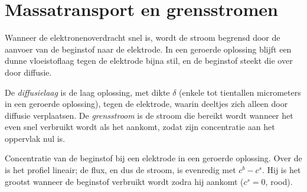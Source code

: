 \section{Massatransport en grensstromen}

Wanneer de elektronenoverdracht snel is, wordt de stroom begrensd door de aanvoer van
de beginstof naar de elektrode. In een geroerde oplossing blijft een dunne vloeistoflaag
tegen de elektrode bijna stil, en de beginstof steekt die over door
diffusie.

\begin{definition}\label{def:b2:current-potential-curves:limiting-current}
De \emph{diffusielaag} is de laag oplossing,
met dikte $\delta$ (enkele tot tientallen micrometers in een geroerde
oplossing), tegen de elektrode, waarin deeltjes zich alleen door diffusie
verplaatsen. De \emph{grensstroom} is de stroom
die bereikt wordt wanneer het  even snel verbruikt wordt als het aankomt,
zodat zijn concentratie aan het oppervlak nul is.
\end{definition}

\begin{omfigure}

{\small Concentratie van de beginstof bij een elektrode in een geroerde
oplossing. Over de  is het profiel lineair; de flux, en dus de
stroom, is evenredig met $c^b - c^s$. Hij is het grootst wanneer de beginstof
verbruikt wordt zodra hij aankomt ($c^s = 0$, rood).}
\end{omfigure}

